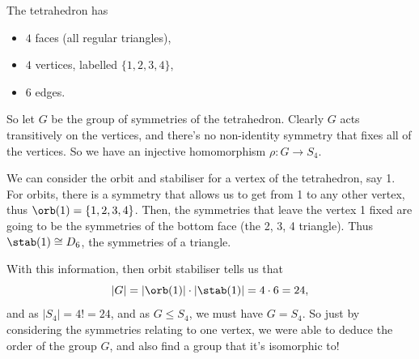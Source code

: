 \documentclass[a4]{scrreprt}
\begin{document}
\begin{center}
\end{center}


The tetrahedron has
\begin{itemize}
	\item $4$ faces (all regular triangles),
	\item $4$ vertices, labelled $\{1, 2, 3, 4\}$,
	\item $6$ edges.
\end{itemize}

So let $G$ be the group of symmetries of the tetrahedron. Clearly $G$ acts transitively on the vertices, and there's no non-identity symmetry that fixes all of the vertices. So we have an injective homomorphism $\rho : G \rightarrow S_4$.

We can consider the orbit and stabiliser for a vertex of the tetrahedron, say 1. For orbits, there is a symmetry that allows us to get from 1 to any other vertex, thus $\orb(1) = \{1, 2, 3, 4\}$. Then, the symmetries that leave the vertex 1 fixed are going to be the symmetries of the bottom face (the 2, 3, 4 triangle). Thus $\stab(1) \cong D_6$, the symmetries of a triangle. 

With this information, then orbit stabiliser tells us that
$$
|G| = |\orb(1)| \cdot |\stab(1)| = 4 \cdot 6 = 24,
$$
and as $|S_4| = 4! = 24$, and as $G \leq S_4$, we must have $G = S_4$. So just by considering the symmetries relating to one vertex, we were able to deduce the order of the group $G$, and also find a group that it's isomorphic to!
\end{document}

